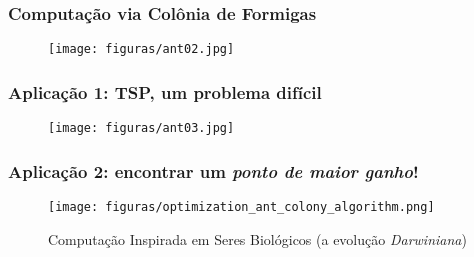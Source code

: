 \documentclass{beamer}
\begin{document}
\begin{frame}
\frametitle{Computação via Colônia de Formigas}
\begin{figure}[ht!]
 \centering
 \texttt{[image: figuras/ant02.jpg]}
\end{figure}
\end{frame}

\begin{frame}
\frametitle{Aplicação 1: TSP, um problema difícil}
\begin{figure}[ht!]
 \centering
 \texttt{[image: figuras/ant03.jpg]}
\end{figure}
\end{frame}

\begin{comment}
\subsection{Computação Natural}

\begin{frame}
\frametitle{Exemplo da genética}

\begin{figure}[ht!]
 \centering
 \texttt{[image: figuras/parents\_offsprings.jpg]}
 \caption{Temos conceitos como: populações, soluções--candidatas, \textit{fitness}, etc.} 
   \end{figure}
  \end{frame}
\end{comment}


\begin{frame}

\frametitle{Aplicação 2: encontrar um \textit{ponto de maior ganho}!}

\begin{figure}[ht!]
 \centering
 \texttt{[image: figuras/optimization\_ant\_colony\_algorithm.png]}

\caption{Computação Inspirada em Seres Biológicos (a evolução \textit{Darwiniana})} 
\end{figure}
  

\end{frame}
\end{document}
